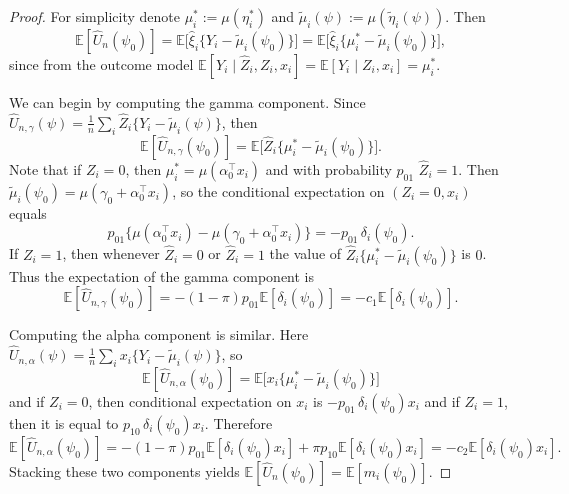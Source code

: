 \documentclass[11pt]{article}
\newtheorem{proposition}{Proposition}
\theoremstyle{definition}
\theoremstyle{remark}
\newcommand{\E}{\mathbb{E}}
\begin{document}
\begin{proof}
For simplicity denote $\mu_i^*:=\mu(\eta_i^*)$ and $\tilde\mu_i(\psi):=\mu(\tilde\eta_i(\psi))$. Then
\[
\E[\hat U_n(\psi_0)]=\E\big[\hat\xi_i\{Y_i-\tilde\mu_i(\psi_0)\}\big]=\E\big[\hat\xi_i\{\mu_i^*-\tilde\mu_i(\psi_0)\}\big],
\]
since from the outcome model $ \E[Y_i\mid\hat Z_i, Z_i,x_i]= \E[Y_i\mid Z_i,x_i]=\mu_i^*$.

We can begin by computing the gamma component. Since $\hat U_{n,\gamma}(\psi)=\frac{1}{n}\sum_i\hat Z_i\{Y_i-\tilde\mu_i(\psi)\}$, then
\[
\E[\hat U_{n,\gamma}(\psi_0)]=\E\big[\hat Z_i\{\mu_i^*-\tilde\mu_i(\psi_0)\}\big].
\]
Note that if $Z_i=0$, then $\mu_i^*=\mu(\alpha_0^\top x_i)$ and with probability $p_{01}$ $\hat Z_i=1$. Then $\tilde\mu_i(\psi_0)=\mu(\gamma_0+\alpha_0^\top x_i)$, so the conditional expectation on $(Z_i=0, x_i)$ equals
\[p_{01}\{\mu(\alpha_0^\top x_i)-\mu(\gamma_0+\alpha_0^\top x_i)\}=-p_{01}\,\delta_i(\psi_0).\]
If $Z_i=1$, then whenever $\hat Z_i=0$ or $\hat Z_i=1$ the value of $\hat Z_i \{\mu_i^*-\tilde\mu_i(\psi_0)\}$ is $0$. Thus the expectation of the gamma component is
\[\E[\hat U_{n,\gamma}(\psi_0)]=-(1-\pi)p_{01}\E[\delta_i(\psi_0)]=-c_1\E[\delta_i(\psi_0)].\]

Computing the alpha component is similar. Here $\hat U_{n,\alpha}(\psi)=\frac{1}{n}\sum_ix_i\{Y_i-\tilde\mu_i(\psi)\}$, so
\[\E[\hat U_{n,\alpha}(\psi_0)]=\E\big[x_i\{\mu_i^*-\tilde\mu_i(\psi_0)\}\big]\]
and if $Z_i=0$, then conditional expectation on $x_i$ is $-p_{01}\,\delta_i(\psi_0)x_i$ and if $Z_i=1$, then it is equal to $p_{10}\,\delta_i(\psi_0)x_i$. Therefore
\[
\E[\hat U_{n,\alpha}(\psi_0)]=-(1-\pi)p_{01}\E[\delta_i(\psi_0)x_i]+\pi p_{10}\E[\delta_i(\psi_0)x_i]=-c_2\E[\delta_i(\psi_0)x_i].
\]
Stacking these two components yields $\E[\hat U_n(\psi_0)]=\E[m_i(\psi_0)]$.
\end{proof}


\end{document}
